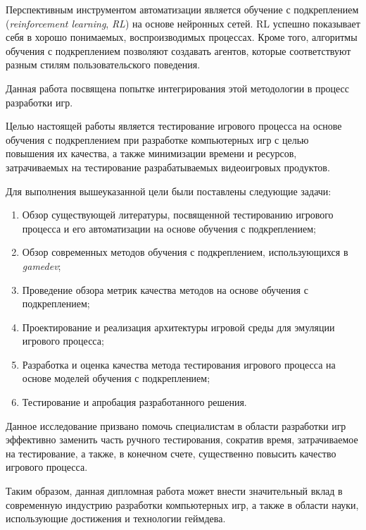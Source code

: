 Перспективным инструментом автоматизации является обучение с подкреплением (\textit{reinforcement learning}, \textit{RL}) на основе нейронных сетей. RL успешно показывает себя в хорошо понимаемых, воспроизводимых процессах. Кроме того, алгоритмы обучения с подкреплением позволяют создавать агентов, которые соответствуют разным стилям пользовательского поведения.

Данная работа посвящена попытке интегрирования этой методологии в процесс разработки игр.

Целью настоящей работы является тестирование игрового процесса на основе обучения с подкреплением при разработке компьютерных игр с целью повышения их качества, а также минимизации времени и ресурсов, затрачиваемых на тестирование разрабатываемых видеоигровых продуктов.

Для выполнения вышеуказанной цели были поставлены следующие задачи:
\begin{enumerate}
	\item Обзор существующей литературы, посвященной тестированию игрового процесса и его автоматизации на основе обучения с подкреплением;
	\item Обзор современных методов обучения с подкреплением, использующихся в \textit{gamedev};
	\item Проведение обзора метрик качества методов на основе обучения с подкреплением;
	\item Проектирование и реализация архитектуры игровой среды для эмуляции игрового процесса;
	\item Разработка и оценка качества метода тестирования игрового процесса на основе моделей обучения с подкреплением;
	\item Тестирование и апробация разработанного решения.
\end{enumerate}

Данное исследование призвано помочь специалистам в области разработки игр эффективно заменить часть ручного тестирования, сократив время, затрачиваемое на тестирование, а также, в конечном счете, существенно повысить качество игрового процесса.

Таким образом, данная дипломная работа может внести значительный вклад в современную индустрию разработки компьютерных игр, а также в области науки, использующие достижения и технологии геймдева.

%



